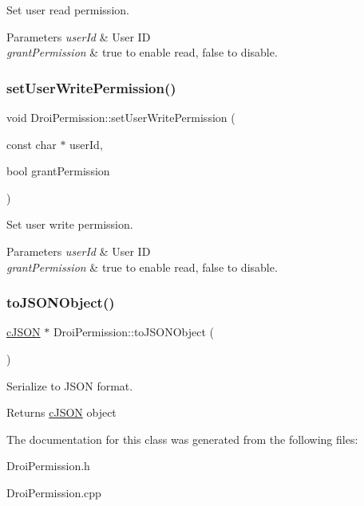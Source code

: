 Set user read permission. 
\begin{DoxyParams}{Parameters}
{\em user\+Id} & User ID \\
\hline
{\em grant\+Permission} & true to enable read, false to disable. \\
\hline
\end{DoxyParams}
\mbox{\label{class_droi_permission_a8843fc5d39dcb65a883f92437f433d8e}} 
\subsubsection{\texorpdfstring{set\+User\+Write\+Permission()}{setUserWritePermission()}}
{\footnotesize\ttfamily void Droi\+Permission\+::set\+User\+Write\+Permission (\begin{DoxyParamCaption}\item[{const char $\ast$}]{user\+Id,  }\item[{bool}]{grant\+Permission }\end{DoxyParamCaption})}

Set user write permission. 
\begin{DoxyParams}{Parameters}
{\em user\+Id} & User ID \\
\hline
{\em grant\+Permission} & true to enable read, false to disable. \\
\hline
\end{DoxyParams}
\mbox{\label{class_droi_permission_a3db387c0552fe5d24353027a3868159f}} 
\subsubsection{\texorpdfstring{to\+J\+S\+O\+N\+Object()}{toJSONObject()}}
{\footnotesize\ttfamily \hyperlink{structc_j_s_o_n}{c\+J\+S\+ON} $\ast$ Droi\+Permission\+::to\+J\+S\+O\+N\+Object (\begin{DoxyParamCaption}{ }\end{DoxyParamCaption})}

Serialize to J\+S\+ON format. \begin{DoxyReturn}{Returns}
\hyperlink{structc_j_s_o_n}{c\+J\+S\+ON} object 
\end{DoxyReturn}


The documentation for this class was generated from the following files\+:\begin{DoxyCompactItemize}
\item 
Droi\+Permission.\+h\item 
Droi\+Permission.\+cpp\end{DoxyCompactItemize}
